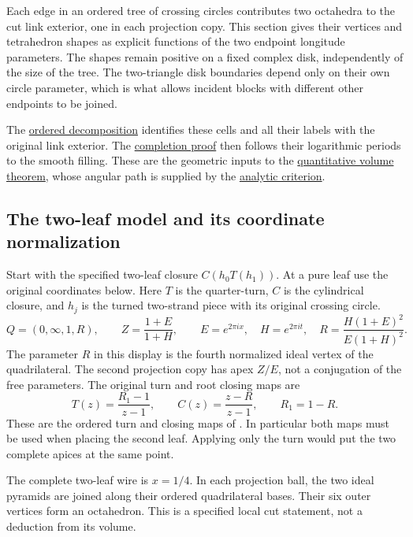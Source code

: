 Each edge in an ordered tree of crossing circles contributes two octahedra to the cut link exterior, one in each projection copy. This section gives their vertices and tetrahedron shapes as explicit functions of the two endpoint longitude parameters. The shapes remain positive on a fixed complex disk, independently of the size of the tree. The two-triangle disk boundaries depend only on their own circle parameter, which is what allows incident blocks with different other endpoints to be joined.

The \hyperref[sec:ft]{ordered decomposition} identifies these cells and all their labels with the original link exterior. The \hyperref[sec:fg]{completion proof} then follows their logarithmic periods to the smooth filling. These are the geometric inputs to the \hyperref[ch:quantitative-circle-trees]{quantitative volume theorem}, whose angular path is supplied by the \hyperref[sec:qe]{analytic criterion}.

\subsection{The two-leaf model and its coordinate normalization}\label{sec:fa-1}

Start with the specified two-leaf closure \(C(h_0T(h_1))\). At a pure leaf use the original coordinates below. Here \(T\) is the quarter-turn, \(C\) is the cylindrical closure, and \(h_j\) is the turned two-strand piece with its original crossing circle.
\begin{equation}
Q=(0,\infty,1,R),\qquad
 Z=\frac{1+E}{1+H},\qquad
 E=e^{2\pi ix},\quad H=e^{2\pi it},
 \quad R=\frac{H(1+E)^2}{E(1+H)^2}.
\label{eq:fa-1}
\end{equation}
The parameter \(R\) in this display is the fourth normalized ideal vertex of the quadrilateral. The second projection copy has apex \(Z/E\), not a conjugation of the free parameters. The original turn and root closing maps are
\begin{equation}
T(z)=\frac{R_1-1}{z-1},\qquad
 C(z)=\frac{z-R}{z-1},\qquad R_1=1-R.
\label{eq:fa-2}
\end{equation}
These are the ordered turn and closing maps of
\cite[Section~3, equation~(3.2)]{CircleTreeGeometry}.
In particular both maps must be used when placing the second leaf. Applying only the turn would put the two complete apices at the same point.

The complete two-leaf wire is \(x=1/4\). In each projection ball, the two ideal pyramids are joined along their ordered quadrilateral bases. Their six outer vertices form an octahedron. This is a specified local cut statement, not a deduction from its volume.

